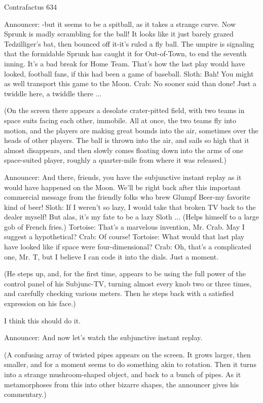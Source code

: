 Contrafactus                                                                             634

Announcer: -but it seems to be a spitball, as it takes a strange curve. Now Sprunk is
   madly scrambling for the ball! It looks like it just barely grazed Tedzilliger's bat, then
   bounced off it-it's ruled a fly ball. The umpire is signaling that the formidable Sprunk
   has caught it for Out-of-Town, to end the seventh inning. It's a bad break for Home
   Team. That's how the last play would have looked, football fans, if this had been a
   game of baseball.
Sloth: Bah! You might as well transport this game to the Moon.
Crab: No sooner said than done! Just a twiddle here, a twiddle there ...

   (On the screen there appears a desolate crater-pitted field, with two teams in space
   suits facing each other, immobile. All at once, the two teams fly into motion, and the
   players are making great bounds into the air, sometimes over the heads of other
   players. The ball is thrown into the air, and sails so high that it almost disappears,
   and then slowly comes floating down into the arms of one space-suited player, roughly
   a quarter-mile from where it was released.)

Announcer: And there, friends, you have the subjunctive instant replay as it would have
   happened on the Moon. We'll be right back after this important commercial message
   from the friendly folks who brew Glumpf Beer-my favorite kind of beer!
Sloth: If I weren't so lazy, I would take that broken TV back to the dealer myself! But
   alas, it's my fate to be a lazy Sloth ... (Helps himself to a large gob of French fries.)
Tortoise: That's a marvelous invention, Mr. Crab. May I suggest a hypothetical?
Crab: Of course!
Tortoise: What would that last play have looked like if space were four-dimensional?
Crab: Oh, that's a complicated one, Mr. T, but I believe I can code it into the dials. Just a
   moment.

   (He steps up, and, for the first time, appears to be using the full power of the control
   panel of his Subjunc-TV, turning almost every knob two or three times, and carefully
   checking various meters. Then he steps back with a satisfied expression on his face.)

I think this should do it.

Announcer: And now let's watch the subjunctive instant replay.

   (A confusing array of twisted pipes appears on the screen. It grows larger, then
   smaller, and for a moment seems to do something akin to rotation. Then it turns into a
   strange mushroom-shaped object, and back to a bunch of pipes. As it metamorphoses
   from this into other bizarre shapes, the announcer gives his commentary.)

